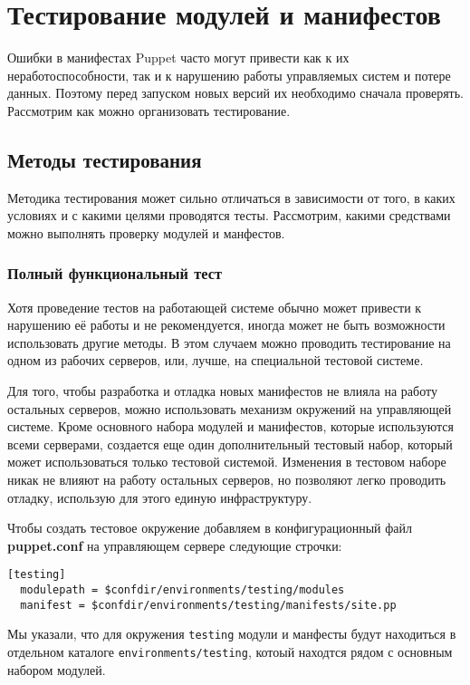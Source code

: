 \chapter{Тестирование модулей и манифестов}

Ошибки в манифестах Puppet часто могут привести как к их неработоспособности, так и к нарушению работы управляемых систем и потере данных. Поэтому перед запуском новых версий их необходимо сначала проверять. Рассмотрим как можно организовать тестирование.

\section{Методы тестирования}

Методика тестирования может сильно отличаться в зависимости от того, в каких условиях и с какими целями проводятся тесты. Рассмотрим, какими средствами можно выполнять проверку модулей и манфестов.

\subsection{Полный функциональный тест}

Хотя проведение тестов на работающей системе обычно может привести к нарушению её работы и не рекомендуется, иногда может не быть возможности использовать другие методы. В этом случаем можно проводить тестирование на одном из рабочих серверов, или, лучше, на специальной тестовой системе.

Для того, чтобы разработка и отладка новых манифестов не влияла на работу остальных серверов, можно использовать механизм окружений на управляющей системе. Кроме основного набора модулей и манифестов, которые используются всеми серверами, создается еще один дополнительный тестовый набор, который может использоваться только тестовой системой. Изменения в тестовом наборе никак не влияют на работу остальных серверов, но позволяют легко проводить отладку, использую для этого единую инфраструктуру.

Чтобы создать тестовое окружение добавляем в конфигурационный файл \textbf{puppet.conf} на управляющем сервере следующие строчки:

\begin{verbatim}
[testing]
  modulepath = $confdir/environments/testing/modules
  manifest = $confdir/environments/testing/manifests/site.pp
\end{verbatim}

Мы указали, что для окружения \texttt{testing} модули и манфесты будут находиться в отдельном каталоге \texttt{environments/testing}, котоый находтся рядом с основным набором модулей.

